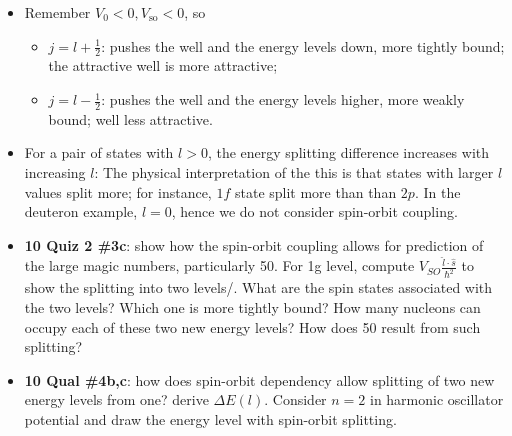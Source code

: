 \documentclass{school-22.101-notes}
\begin{document}
  \begin{itemize}
  \item Remember $V_0 < 0, V_{\mathrm{so}} < 0$, so 
    \begin{itemize}
    \item $j = l+\frac{1}{2}$: pushes the well and the energy levels down, more tightly bound; the attractive well is more attractive; 
    \item $j = l - \frac{1}{2}$: pushes the well and the energy levels higher, more weakly bound; well less attractive. 
    \end{itemize}    
  \item For a pair of states with $l>0$, the energy splitting difference increases with increasing $l$:
    The physical interpretation of the this is that states with larger $l$ values split more; for instance, $1f$ state split more than than $2p$. In the deuteron example, $l=0$, hence we do not consider spin-orbit coupling.               

  \item \textbf{10 Quiz 2 \#3c}: show how the spin-orbit coupling allows for prediction of the large magic numbers, particularly 50. For 1g level, compute $V_{SO} \frac{\hat{l} \cdot \hat{s}}{\hbar^2}$ to show the splitting into two levels/. What are the spin states associated with the two levels? Which one is more tightly bound? How many nucleons can occupy each of these two new energy levels? How does 50 result from such splitting? 

  \item \textbf{10 Qual \#4b,c}: how does spin-orbit dependency allow splitting of two new energy levels from one? derive $\Delta E(l)$. Consider $n=2$ in harmonic oscillator potential and draw the energy level with spin-orbit splitting. 
  \end{itemize}
\end{document}
